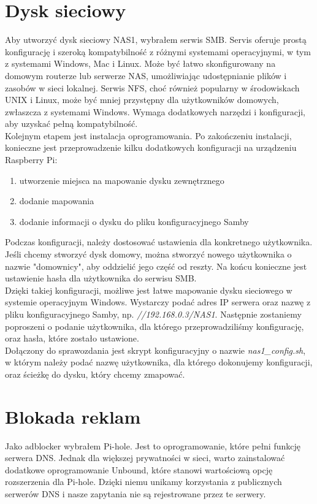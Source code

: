\documentclass{article}
\begin{document}
\section{Dysk sieciowy}
Aby utworzyć dysk sieciowy NAS1, wybrałem serwis SMB. Servis oferuje prostą konfigurację i szeroką kompatybilność z różnymi systemami operacyjnymi, w tym z systemami Windows, Mac i Linux. Może być łatwo skonfigurowany na domowym routerze lub serwerze NAS, umożliwiając udostępnianie plików i zasobów w sieci lokalnej. Serwis NFS, choć również popularny w środowiskach UNIX i Linux, może być mniej przystępny dla użytkowników domowych, zwłaszcza z systemami Windows. Wymaga dodatkowych narzędzi i konfiguracji, aby uzyskać pełną kompatybilność.\\

Kolejnym etapem jest instalacja oprogramowania. Po zakończeniu instalacji, konieczne jest przeprowadzenie kilku dodatkowych konfiguracji na urządzeniu Raspberry Pi:
\begin{enumerate}[label=\textbullet]
  \item utworzenie miejsca na mapowanie dysku zewnętrznego
  \item dodanie mapowania
  \item dodanie informacji o dysku do pliku konfiguracyjnego Samby
\end{enumerate}
Podczas konfiguracji, należy dostosować ustawienia dla konkretnego użytkownika. Jeśli chcemy stworzyć dysk domowy, można stworzyć nowego użytkownika o nazwie "domownicy", aby oddzielić jego część od reszty. Na końcu konieczne jest ustawienie hasła dla użytkownika do serwisu SMB.\\

Dzięki takiej konfiguracji, możliwe jest łatwe mapowanie dysku sieciowego w systemie operacyjnym Windows. Wystarczy podać adres IP serwera oraz nazwę z pliku konfiguracyjnego Samby, np. \textit{//192.168.0.3/NAS1}. Następnie zostaniemy poproszeni o podanie użytkownika, dla którego przeprowadziliśmy konfigurację, oraz hasła, które zostało ustawione.\\

Dołączony do sprawozdania jest skrypt konfiguracyjny o nazwie \textit{nas1\_config.sh}, w którym należy podać nazwę użytkownika, dla którego dokonujemy konfiguracji, oraz ścieżkę do dysku, który chcemy zmapować.\cite{smbBlog}


\section{Blokada reklam}
Jako adblocker wybrałem Pi-hole. Jest to oprogramowanie, które pełni funkcję serwera DNS. Jednak dla większej prywatności w sieci, warto zainstalować dodatkowe oprogramowanie Unbound, które stanowi wartościową opcję rozszerzenia dla Pi-hole. Dzięki niemu unikamy korzystania z publicznych serwerów DNS i nasze zapytania nie są rejestrowane przez te serwery.\\
\end{document}
